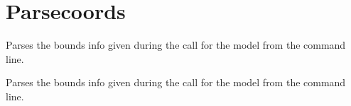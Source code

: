 \hypertarget{group__parsecoords}{}\section{Parsecoords}
\label{group__parsecoords}


Parses the bounds info given during the call for the model from the command line.  


Parses the bounds info given during the call for the model from the command line. 

